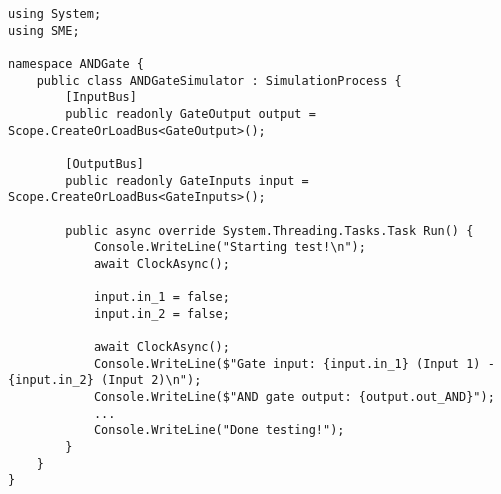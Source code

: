 \begin{lstlisting}[language={[Sharp]C}, caption={The simulator file, which specifies how the simulation is run.},captionpos=b, label = simulatorfile]
using System;
using SME;

namespace ANDGate {
    public class ANDGateSimulator : SimulationProcess {
        [InputBus]
        public readonly GateOutput output = Scope.CreateOrLoadBus<GateOutput>();
        
        [OutputBus]
        public readonly GateInputs input = Scope.CreateOrLoadBus<GateInputs>();
        
        public async override System.Threading.Tasks.Task Run() {
            Console.WriteLine("Starting test!\n");
            await ClockAsync();
            
            input.in_1 = false;
            input.in_2 = false;
            
            await ClockAsync();
            Console.WriteLine($"Gate input: {input.in_1} (Input 1) - {input.in_2} (Input 2)\n");
            Console.WriteLine($"AND gate output: {output.out_AND}");
            ...
            Console.WriteLine("Done testing!");
        }
    }
}
\end{lstlisting}
    
    
